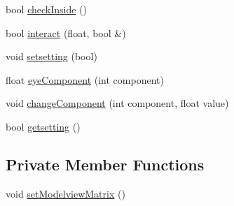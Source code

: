 \begin{DoxyCompactItemize}
\item 
bool \hyperlink{classcamera_ae8d364c57e362bc1141625896c1a88e2}{check\+Inside} ()
\item 
bool \hyperlink{classcamera_a5f2c4ec9152aa1a4b5b269e477370d84}{interact} (float, bool \&)
\item 
void \hyperlink{classcamera_a32324b26eeec589c67d6a57bdf6d569d}{setsetting} (bool)
\item 
float \hyperlink{classcamera_a66f5b769bac0e8e0061b9ee218742aa2}{eye\+Component} (int component)
\item 
void \hyperlink{classcamera_a50833d5cf4b6237cfd7a32f8c168ab6b}{change\+Component} (int component, float value)
\item 
bool \hyperlink{classcamera_a064c75537e4e10added1ef58a702d35d}{getsetting} ()
\end{DoxyCompactItemize}
\subsection*{Private Member Functions}
\begin{DoxyCompactItemize}
\item 
void \hyperlink{classcamera_adb0b12de88728a7b9e122ea950f8cad1}{set\+Modelview\+Matrix} ()
\end{DoxyCompactItemize}
